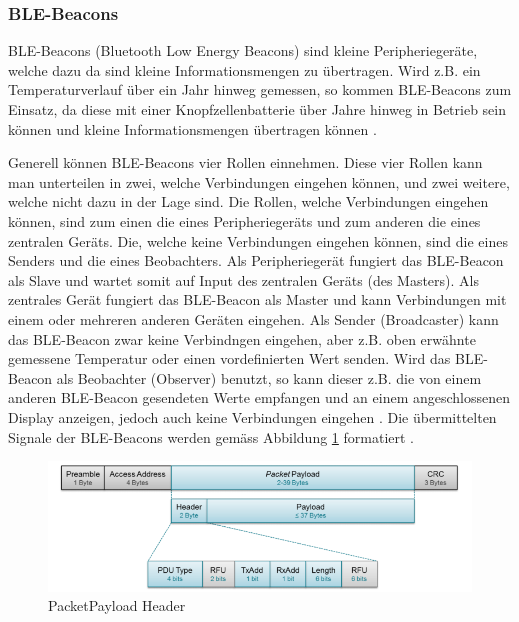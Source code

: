 \subsubsection{BLE-Beacons}
BLE-Beacons (Bluetooth Low Energy Beacons) sind kleine Peripheriegeräte, welche dazu da sind kleine Informationsmengen zu übertragen. Wird z.B. ein Temperaturverlauf über ein Jahr hinweg gemessen, so kommen BLE-Beacons zum Einsatz, da diese mit einer Knopfzellenbatterie über Jahre hinweg in Betrieb sein können und kleine Informationsmengen übertragen können \cite{9_Teildokument_BT}.

Generell können BLE-Beacons vier Rollen einnehmen. Diese vier Rollen kann man unterteilen in zwei, welche Verbindungen eingehen können, und zwei weitere, welche nicht dazu in der Lage sind. Die Rollen, welche Verbindungen eingehen können, sind zum einen die eines Peripheriegeräts und zum anderen die eines zentralen Geräts. Die, welche keine Verbindungen eingehen können, sind die eines Senders und die eines Beobachters. Als Peripheriegerät fungiert das BLE-Beacon als Slave und wartet somit auf Input des zentralen Geräts (des Masters). Als zentrales Gerät fungiert das BLE-Beacon als Master und kann Verbindungen mit einem oder mehreren anderen Geräten eingehen. Als Sender (Broadcaster) kann das BLE-Beacon zwar keine Verbindngen eingehen, aber z.B. oben erwähnte gemessene Temperatur oder einen vordefinierten Wert senden. Wird das BLE-Beacon als Beobachter (Observer) benutzt, so kann dieser z.B. die von einem anderen BLE-Beacon gesendeten Werte empfangen und an einem angeschlossenen Display anzeigen, jedoch auch keine Verbindungen eingehen \cite{9_Teildokument_BT}. Die übermittelten Signale der BLE-Beacons werden gemäss Abbildung \ref{fig:PacketPayload_Header} formatiert \cite{9_Teildokument_BT}.

\begin{figure}[htbp!!!!]
	\begin{center}
		\includegraphics[width=\textwidth]{data/PacketPayload_Header.png}
		\caption[PacketPayload Header]{PacketPayload Header} %
		\label{fig:PacketPayload_Header}
	\end{center}
\end{figure}

